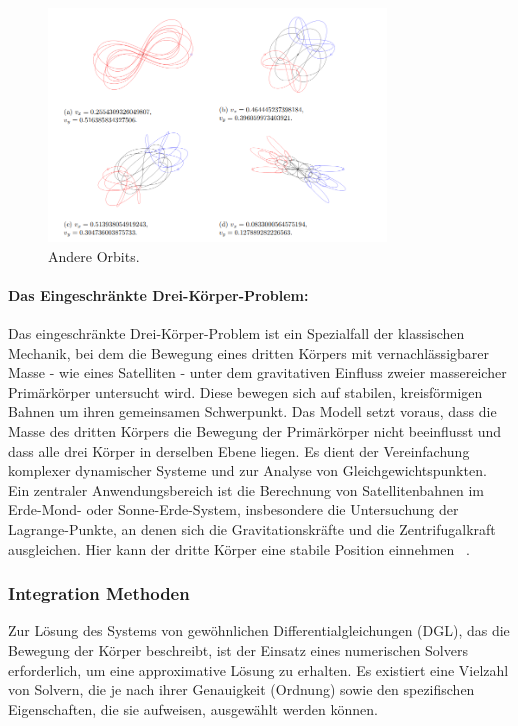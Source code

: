 \documentclass[a4paper,12pt,twoside]{article}
\begin{document}
\begin{figure}[H]
    \centering
    \includegraphics[width=0.8\textwidth]{AndereOrbits.png}
    \caption{Andere Orbits.}
    \label{Abb:andereOrbits}
\end{figure}

\paragraph{Das Eingeschränkte Drei-Körper-Problem:}
Das eingeschränkte Drei-Körper-Problem ist ein Spezialfall der klassischen Mechanik, bei dem die Bewegung eines dritten Körpers mit vernachlässigbarer Masse - wie eines Satelliten - unter dem gravitativen Einfluss zweier massereicher Primärkörper untersucht wird. Diese bewegen sich auf stabilen, kreisförmigen Bahnen um ihren gemeinsamen Schwerpunkt.
Das Modell setzt voraus, dass die Masse des dritten Körpers die Bewegung der Primärkörper nicht beeinflusst und dass alle drei Körper in derselben Ebene liegen. Es dient der Vereinfachung komplexer dynamischer Systeme und zur Analyse von Gleichgewichtspunkten.
Ein zentraler Anwendungsbereich ist die Berechnung von Satellitenbahnen im Erde-Mond- oder Sonne-Erde-System, insbesondere die Untersuchung der Lagrange-Punkte, an denen sich die Gravitationskräfte und die Zentrifugalkraft ausgleichen. Hier kann der dritte Körper eine stabile Position einnehmen ~\cite{Weber}.


\subsubsection{Integration Methoden}
Zur Lösung des Systems von gewöhnlichen Differentialgleichungen (DGL), das die Bewegung der Körper beschreibt, ist der Einsatz eines numerischen Solvers erforderlich, um eine approximative Lösung zu erhalten. Es existiert eine Vielzahl von Solvern, die je nach ihrer Genauigkeit (Ordnung) sowie den spezifischen Eigenschaften, die sie aufweisen, ausgewählt werden können.
\end{document}
